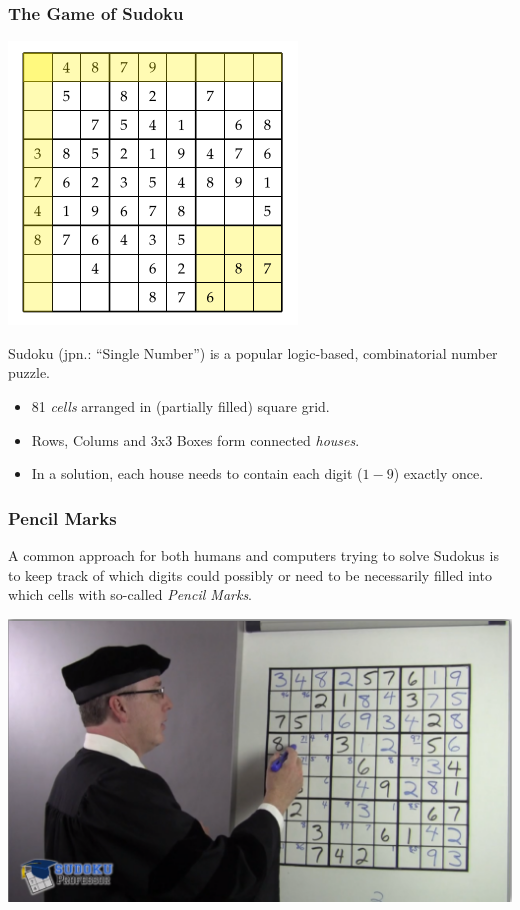 \documentclass[aspectratio=169, usenames, dvipsnames]{beamer}
\begin{document}
\begin{frame}
\frametitle{The Game of Sudoku}
\begin{minipage}{0.45\textwidth}
\begin{center}
\includegraphics[height=0.70\textheight,keepaspectratio]{images/sudoku_blank} 
\end{center}
\end{minipage}
\begin{minipage}{0.475\textwidth}
Sudoku (jpn.: ``Single Number'') is a popular logic-based, combinatorial number puzzle.
\bigskip
\begin{itemize}
\item 81 \emph{cells} arranged in (partially filled) square grid.
\item Rows, Colums and 3x3 Boxes form connected \emph{houses}.
\item In a solution, each house needs to contain each digit ($1-9$) exactly once.
\end{itemize}
\end{minipage}

\end{frame}

\begin{frame}
\frametitle{Pencil Marks}

A common approach for both humans and computers trying to solve Sudokus is to keep track of which digits could possibly or need to be necessarily filled into which cells with so-called \emph{Pencil Marks}.

\begin{center}
\includegraphics[height=0.5\textheight, keepaspectratio]{images/professor_pencil_mark.png} 
\end{center}
\end{frame}
\end{document}
